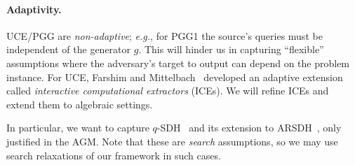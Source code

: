 {\begin{itemize}

\paragraph*{Adaptivity.} UCE/PGG are \emph{non-adaptive}; \emph{e.g.}, for PGG1  the source's queries must be independent of the generator $g$. This will hinder us in capturing ``flexible'' assumptions where the adversary's target to output can depend on the problem instance. For  UCE, Farshim and Mittelbach~\cite{FSE:FarMit16} developed an adaptive extension called \emph{interactive computational extractors} (ICEs).  We will refine ICEs and extend them to  algebraic settings. 

In particular, we want to capture %
 $q$-SDH~\cite{JC:BonBoy08} and its extension to ARSDH~\cite{EC:LipParSii24},   only  justified in the AGM. Note that these are \emph{search} assumptions, so we may use search relaxations of our framework in such cases.



\end{itemize}}
